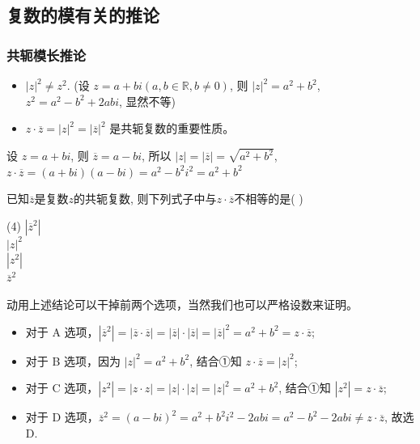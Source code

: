 \vspace{4em}

\subsection{复数的模有关的推论}

\subsubsection{共轭模长推论}

\begin{theorem}[共轭模长推论]
    \begin{itemize}
        \item $|z|^{2}\ne z^{2}$. (设 $z=a+bi(a,b\in \mathbb{R},b\ne0)$, 则 $|z|^{2}=a^{2}+b^{2}$, $z^{2}=a^{2}-b^{2}+2abi$, 显然不等)
        \item  $z\cdot\overline{z}=|z|^{2}=|\overline{z}|^{2}$ 是共轭复数的重要性质。
    \end{itemize}

    \begin{tips}
        设 $z=a+bi$, 则 $\overline{z}=a-bi$, 所以 $|z|=|\overline{z}|=\sqrt{a^{2}+b^{2}}$, $z\cdot\overline{z}=(a+bi)(a-bi)=a^{2}-b^{2}i^{2}=a^{2}+b^{2}$
    \end{tips}
\end{theorem}

\begin{example}
    已知$\overline{z}$是复数$z$的共轭复数, 则下列式子中与$z\cdot\overline{z}$不相等的是( \quad )
    \begin{tasks}(4)
        \task $|\overline{z}^{2}|$ \\
        \task $|z|^{2}$ \\
        \task $|z^{2}|$ \\
        \task $\overline{z}^{2}$
    \end{tasks}
\end{example}

\begin{solution}
    动用上述结论可以干掉前两个选项，当然我们也可以严格设数来证明。
    \begin{itemize}
        \item 对于 A 选项，$|\overline{z}^{2}|=|\overline{z}\cdot\overline{z}|=|\overline{z}|\cdot|\overline{z}|=|\overline{z}|^{2}=a^{2}+b^{2}=z\cdot\overline{z}$;
        \item 对于 B 选项，因为 $|z|^{2}=a^{2}+b^{2}$, 结合①知 $z\cdot\overline{z}=|z|^{2}$;
        \item 对于 C 选项，$|z^{2}|=|z\cdot z|=|z|\cdot|z|=|z|^{2}=a^{2}+b^{2}$, 结合①知 $|z^{2}|=z\cdot\overline{z}$;
        \item 对于 D 选项，$\overline{z}^{2}=(a-bi)^{2}=a^{2}+b^{2}i^{2}-2abi=a^{2}-b^{2}-2abi\ne z\cdot\overline{z}$, 故选D.
    \end{itemize}
\end{solution}

